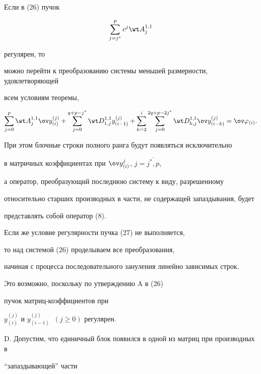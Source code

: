 \begin{pf}
Если в (26) пучок


\begin{equation}


\sum_{j=j^*}^{p}{c^j \wt A_{j}^{1,1} }


\end{equation}


регулярен, то


можно перейти к преобразованию системы меньшей размерности, удовлетворяющей


всем условиям теоремы,


$$


 \sum_{j=0}^{p}{\wt A_{j}^{1,1} \ov y_{(i)}^{(j)}}+


 \sum_{j=0}^{q+p-j^*}{\wt D_{1,j}^{1,1} y_{(i-1)}^{(j)}}+ 


 \sum_{k=2}^{i}{


 \sum_{j=0}^{2q+p-2j^*}{\wt D_{k,j}^{1,1} \ov y_{(i-k)}^{(j)}}}=


 \ov \varphi_{(i)}.


$$


При этом блочные строки полного ранга будут появляться исключительно


в матричных коэффициентах при $\ov y_{(i)}^j$, $j=\overline{j^*,p}$, 


а оператор, преобразующий последнюю систему к виду, разрешенному


относительно старших производных в части, не содержащей запаздывания, будет 


представлять собой оператор (8).





Если же условие регулярности пучка (27) не выполняется,


то над системой (26) проделываем все преобразования,


начиная с процесса последовательного зануления линейно зависимых строк.


Это возможно, поскольку по утверждению A в (26) 


пучок матриц-коэффициентов при


$y_{(i)}^{(j)}$ и $y_{(i-1)}^{(j)}\;\; (j\ge 0)$ регулярен.


\smallskip





D. Допустим, что единичный блок появился в одной из матриц при производных в


``запаздывающей'' части


\begin{multline}



\end{multline}
\end{pf}
